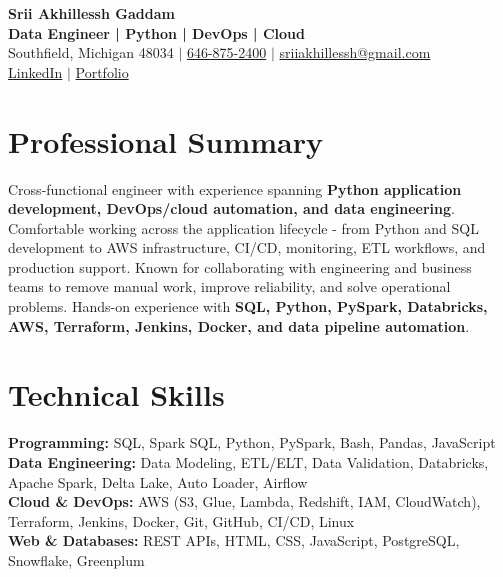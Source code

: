 \documentclass[letterpaper,10pt]{article}
\begin{document}
\fontsize{9.35pt}{10.45pt}\selectfont

\begin{center}
    {\LARGE \textbf{Srii Akhillessh Gaddam}} \\[-1pt]
    \textbf{Data Engineer | Python | DevOps | Cloud} \\[2pt]
    Southfield, Michigan 48034 $|$
    \href{tel:6468752400}{646-875-2400} $|$
    \href{mailto:sriiakhillessh@gmail.com}{sriiakhillessh@gmail.com} \\[1pt]
    \href{https://www.linkedin.com/in/srii-akhiilessh-gaddam-b48668191/}{LinkedIn} $|$
    \href{https://sriiakhillesshg.github.io/portfolio/}{Portfolio}
\end{center}
\vspace{-8pt}

\section{Professional Summary}
\small{Cross-functional engineer with experience spanning \textbf{Python application development, DevOps/cloud automation, and data engineering}. Comfortable working across the application lifecycle - from Python and SQL development to AWS infrastructure, CI/CD, monitoring, ETL workflows, and production support. Known for collaborating with engineering and business teams to remove manual work, improve reliability, and solve operational problems. Hands-on experience with \textbf{SQL, Python, PySpark, Databricks, AWS, Terraform, Jenkins, Docker, and data pipeline automation}.}

\section{Technical Skills}
\small{
\textbf{Programming:} SQL, Spark SQL, Python, PySpark, Bash, Pandas, JavaScript \\
\textbf{Data Engineering:} Data Modeling, ETL/ELT, Data Validation, Databricks, Apache Spark, Delta Lake, Auto Loader, Airflow \\
\textbf{Cloud \& DevOps:} AWS (S3, Glue, Lambda, Redshift, IAM, CloudWatch), Terraform, Jenkins, Docker, Git, GitHub, CI/CD, Linux \\
\textbf{Web \& Databases:} REST APIs, HTML, CSS, JavaScript, PostgreSQL, Snowflake, Greenplum
}

\end{document}
